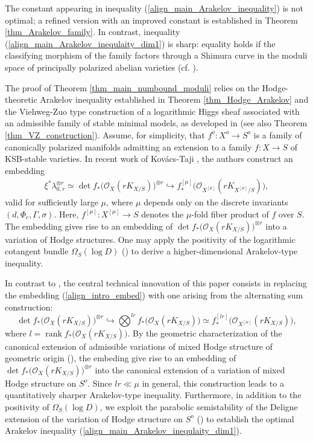 \documentclass[11pt,letterpaper]{amsart}
\numberwithin{equation}{section}
\begin{document}
    The constant appearing in inequality (\ref{align_main_Arakelov_inequality}) is not optimal; a refined version with an improved constant is established in Theorem \ref{thm_Arakelov_family}. In contrast, inequality (\ref{align_main_Arakelov_inequlaity_dim1}) is sharp: equality holds if the classifying morphism of the family factors through a Shimura curve in the moduli space of principally polarized abelian varieties (cf. \cite{VZ2004}).
    
    The proof of Theorem \ref{thm_main_numbound_moduli} relies on the Hodge-theoretic Arakelov inequality established in Theorem \ref{thm_Hodge_Arakelov} and the Viehweg-Zuo type construction of a logarithmic Higgs sheaf associated with an admissible family of stable minimal models, as developed in \cite{stjc2025} (see also Theorem \ref{thm_VZ_construction}). Assume, for simplicity, that $f^o:X^o\to S^o$ is a family of canonically polarized manifolds admitting an extension to a family $f:X\to S$ of KSB-stable varieties. In recent work of Kov\'acs-Taji \cite{Kovacs2024}, the authors construct an embedding  
    \begin{align}\label{align_intro_embed}
    	\xi^\ast\lambda_{0,r}^{\otimes r}\simeq \det f_\ast\big(\mathcal{O}_X(rK_{X/S})\big)^{\otimes r} \hookrightarrow f^{[\mu]}_{\ast}\big(\mathcal{O}_{X^{[\mu]}}(rK_{X^{[\mu]}/S})\big),
    \end{align}  
    valid for sufficiently large $\mu$, where $\mu$ depends only on the discrete invariants $(d,\Phi_c,\Gamma,\sigma)$. Here, $f^{[\mu]}:X^{[\mu]}\to S$ denotes the $\mu$-fold fiber product of $f$ over $S$. The embedding gives rise to an embedding of $\det f_\ast\big(\mathcal{O}_X(rK_{X/S})\big)^{\otimes r}$ into a variation of Hodge structures. One may apply the positivity of the logarithmic cotangent bundle $\Omega_S(\log D)$ (\cite{CP2019}) to derive a higher-dimensional Arakelov-type inequality.
    
    In contrast to \cite{Kovacs2024}, the central technical innovation of this paper consists in replacing the embedding (\ref{align_intro_embed}) with one arising from the alternating sum construction:  
    \[
    \det f_\ast\big(\mathcal{O}_X(rK_{X/S})\big)^{\otimes r} \hookrightarrow \bigotimes^{lr} f_\ast\big(\mathcal{O}_X(rK_{X/S})\big) \simeq f^{[lr]}_{\ast}\big(\mathcal{O}_{X^{[lr]}}(rK_{X/S})\big),
    \]  
    where $l = \operatorname{rank} f_\ast\big(\mathcal{O}_X(rK_{X/S})\big)$. By the geometric characterization of the canonical extension of admissible variations of mixed Hodge structure of geometric origin (\cite{stjc2025}), the embeding give rise to an embedding of $\det f_\ast\big(\mathcal{O}_X(rK_{X/S})\big)^{\otimes r}$ into the canonical extension of a variation of mixed Hodge structure on $S^o$. Since $lr \ll \mu$ in general, this construction leads to a quantitatively sharper Arakelov-type inequality. Furthermore, in addition to the positivity of $\Omega_S(\log D)$, we exploit the parabolic semistability of the Deligne extension of the variation of Hodge structure on $S^o$ (\cite{Simpson1990}) to establish the optimal Arakelov inequality (\ref{align_main_Arakelov_inequlaity_dim1}).
      
\end{document}
